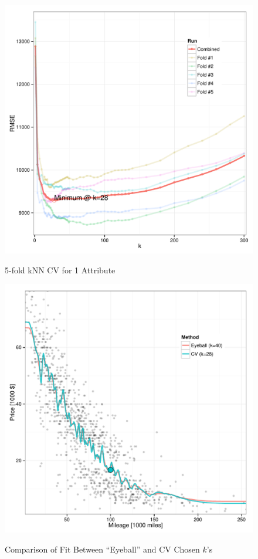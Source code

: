 \documentclass[11pt, fleqn]{article}
\begin{document}
\begin{figure}[!htb]
  \centering
  \caption{5-fold kNN CV for 1 Attribute}
  \includegraphics[scale=.5]{1p_cv_k.pdf}
  \label{fig:1p_k}
\end{figure}

\begin{figure}[!htb]
  \centering
  \caption{Comparison of Fit Between ``Eyeball'' and CV Chosen $k$'s}
  \includegraphics[scale=.5]{1p_fit_eye_ev.pdf}
  \label{fig:1p_fit}
\end{figure}
\end{document}
